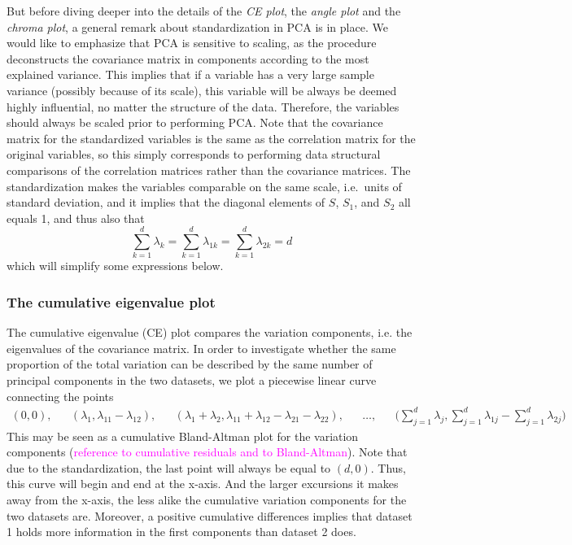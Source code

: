 \documentclass[titlepage,11pt,twoside]{article}
\newcommand{\hl}[1]{\textcolor{magenta}{#1}}
\begin{document}
But before diving deeper into the details of the \emph{CE plot}, the \emph{angle plot} and the \emph{chroma plot}, a general remark about standardization in PCA is in place. We would like to emphasize that PCA is sensitive to scaling, as the procedure deconstructs the covariance matrix in components according to the most explained variance. This implies that if a variable has a very large sample variance (possibly because of its scale), this variable will be always be deemed highly influential, no matter the structure of the data. Therefore, the variables should always be scaled prior to performing PCA. Note that the covariance matrix for the standardized variables is the same as the correlation matrix for the original variables, so this simply corresponds to performing data structural comparisons of the correlation matrices rather than the covariance matrices. The standardization makes the variables comparable on the same scale, i.e.\ units of standard deviation, and it implies that the diagonal elements of $S$, $S_1$, and $S_2$ all equals 1, and thus also that 
$$\sum_{k=1}^d \lambda_k = \sum_{k=1}^d \lambda_{1k} = \sum_{k=1}^d \lambda_{2k} =  d$$
which will simplify some expressions below. 

\subsubsection{The cumulative eigenvalue plot}
 The cumulative eigenvalue (CE) plot compares the variation components, i.e. the eigenvalues of the covariance matrix.
In order to investigate whether the same proportion of the total variation can be described by the same number of principal components in the two datasets, we plot a piecewise linear curve connecting the points
\begin{align*}
(0,0), &&
(\lambda_1,\lambda_{11}-\lambda_{12}), &&
(\lambda_1 + \lambda_2,\lambda_{11}+\lambda_{12}-\lambda_{21}-\lambda_{22}), &&
\ldots, &&
\bigg( \sum_{j=1}^d \lambda_j, \sum_{j=1}^d \lambda_{1j} - \sum_{j=1}^d \lambda_{2j} \bigg)
\end{align*}
This may be seen as a cumulative Bland-Altman plot for the variation components (\hl{reference to cumulative residuals and to Bland-Altman}). Note that due to the standardization, the last point will always be equal to $(d,0)$. Thus, this curve will begin and end at the x-axis. And the larger excursions it makes away from the x-axis, the less alike the cumulative variation components for the two datasets are. Moreover, a positive cumulative differences implies that dataset 1 holds more information in the first components than dataset 2 does. 
\end{document}
